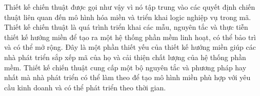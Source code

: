 




Thiết kế chiến thuật được gọi như vậy vì nó tập trung vào các quyết định chiến thuật liên quan đến mô hình hóa miền và triển khai logic nghiệp vụ trong mã. Thiết kế chiến thuật là quá trình triển khai các mẫu, nguyên tắc và thực tiễn thiết kế hướng miền để tạo ra một hệ thống phần mềm linh hoạt, có thể bảo trì và có thể mở rộng. Đây là một phần thiết yếu của thiết kế hướng miền giúp các nhà phát triển sắp xếp mã của họ và cải thiện chất lượng của hệ thống phần mềm. Thiết kế chiến thuật cung cấp một bộ nguyên tắc và phương pháp hay nhất mà nhà phát triển có thể làm theo để tạo mô hình miền phù hợp với yêu cầu kinh doanh và có thể phát triển theo thời gian.













